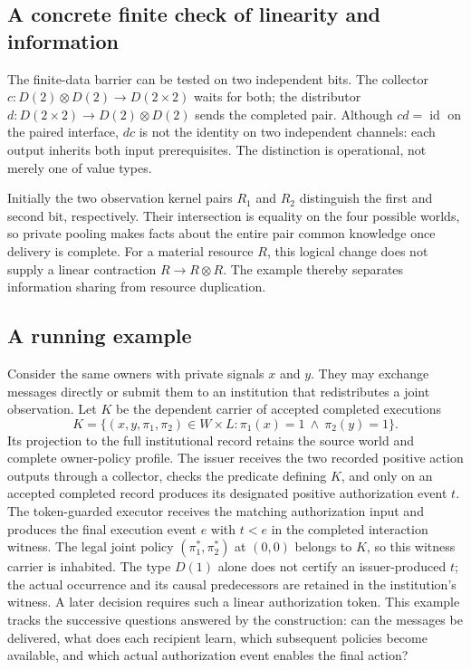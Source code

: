 \documentclass[11pt,a4paper]{article}
\numberwithin{equation}{section}
\theoremstyle{definition}
\theoremstyle{remark}
\theoremstyle{plain}
\providecommand{\id}{\mathop{\mathrm{id}}}
\begin{document}
\subsection{A concrete finite check of linearity and information}

The finite-data barrier can be tested on two independent bits.
The collector $c:D(2)\otimes D(2)\to D(2\times2)$ waits for both;
the distributor $d:D(2\times2)\to D(2)\otimes D(2)$ sends the
completed pair. Although $cd=\id$ on the paired interface,
$dc$ is not the identity on two independent channels: each output
inherits both input prerequisites. The distinction is operational,
not merely one of value types.

Initially the two observation kernel pairs $R_1$ and $R_2$
distinguish the first and second bit, respectively. Their intersection
is equality on the four possible worlds, so private pooling makes facts
about the entire pair common knowledge once delivery is complete.
For a material resource $R$, this logical change does not supply a
linear contraction $R\to R\otimes R$. The example thereby
separates information sharing from resource duplication.

\subsection{A running example}\label{sec:agt-running-example}

Consider the same owners with private signals $x$ and $y$. They may
exchange messages directly or submit them to an institution that
redistributes a joint observation. Let $K$ be the dependent carrier of
accepted completed executions
\[
 K=\{(x,y,\pi_1,\pi_2)\in W\times L:
           \pi_1(x)=1\ \wedge\ \pi_2(y)=1\}.
\]
Its projection to the full institutional record retains the source
world and complete owner-policy profile. The issuer receives the two
recorded positive action outputs through a collector, checks the
predicate defining $K$, and only on an accepted completed record
produces its designated positive authorization event $t$.
The token-guarded executor receives the matching authorization input
and produces the final execution event $e$ with $t<e$ in the
completed interaction witness. The legal joint policy
$(\pi_1^*,\pi_2^*)$ at $(0,0)$ belongs to $K$, so this witness
carrier is inhabited. The type $D(1)$ alone does not certify an
issuer-produced $t$; the actual occurrence and its causal
predecessors are retained in the institution's witness. A later
decision requires such a linear authorization token. This example tracks the successive questions
answered by the construction: can the messages be delivered, what does
each recipient learn, which subsequent policies become available, and
which actual authorization event enables the final action?
\end{document}
